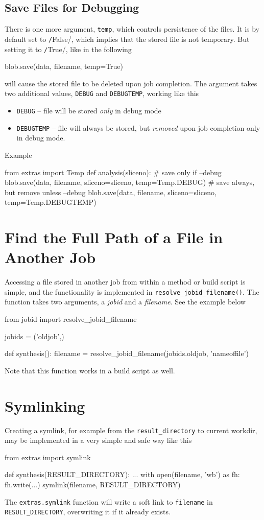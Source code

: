 \subsection{Save Files for Debugging}
There is one more argument, \texttt{temp}, which controls persistence
of the files.  It is by default set to \texttt/False/,
which implies that the stored file is not temporary.  But setting it
to \texttt/True/, like in the following
\begin{python}
    blob.save(data, filename, temp=True)
\end{python}
will cause the stored file to be deleted upon job completion.  The
argument takes two additional values, \texttt{DEBUG} and
\texttt{DEBUGTEMP}, working like this
\begin{itemize}
\item[] \texttt{DEBUG} -- file will be stored \emph{only} in debug
  mode
\item[] \texttt{DEBUGTEMP} -- file will always be stored, but
  \emph{removed} upon job completion only in debug mode.
\end{itemize}
Example
\begin{python}
from extras import Temp
def analysis(sliceno):
  # save only if --debug
  blob.save(data, filename, sliceno=sliceno, temp=Temp.DEBUG)
  # save always, but remove unless --debug
  blob.save(data, filename, sliceno=sliceno, temp=Temp.DEBUGTEMP)
\end{python}



\section{Find the Full Path of a File in Another Job}
Accessing a file stored in another job from within a method or build
script is simple, and the functionality is implemented
in \texttt{resolve\_jobid\_filename()}.  The function takes two
arguments, a \textsl{jobid} and a \textsl{filename}.  See the example
below
\begin{python}
from jobid import resolve_jobid_filename

jobids = ('oldjob',)

def synthesis():
    filename = resolve_jobid_filename(jobids.oldjob, 'nameoffile')
\end{python}
Note that this function works in a build script as well.



\section{Symlinking}
Creating a symlink, for example from the \texttt{result\_directory} to
current workdir, may be implemented in a very simple and safe way like
this
\begin{python}
from extras import symlink

def synthesis(RESULT_DIRECTORY):
    ...
    with open(filename, 'wb') as fh:
         fh.write(...)
    symlink(filename, RESULT_DIRECTORY)
\end{python}
The \texttt{extras.symlink} function will write a soft link
to \texttt{filename} in \texttt{RESULT\_DIRECTORY}, overwriting it if
it already exists.

